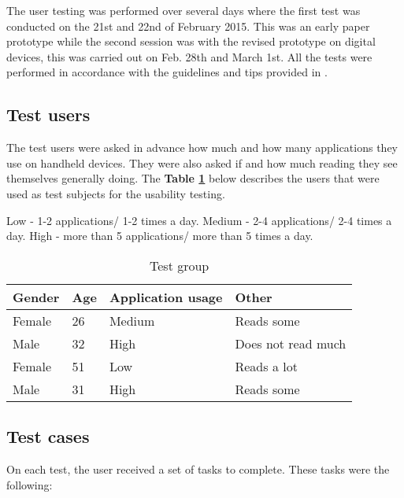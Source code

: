 The user testing was performed over several days where the first test was conducted on the 21st and 22nd of February 2015. This was an early paper prototype while the second session was with the revised prototype on digital devices\cite{protoIO}, this was carried out on Feb. 28th and March 1st. All the tests were performed in accordance with the guidelines and tips provided in \cite{norman2007designing}.

\subsection{Test users}

The test users were asked in advance how much and how many applications they use on handheld devices. They were also asked if and how much reading they see themselves generally doing. The \textbf{Table \ref{Tab:testgroup}} below describes the users that were used as test subjects for the usability testing.  \newline

Low - 1-2 applications/ 1-2 times a day.\newline
Medium - 2-4 applications/ 2-4 times a day.\newline
High - more than 5 applications/ more than 5 times a day.

\begin{table}[H]
	\caption{Test group}
	\label{Tab:testgroup}
	\begin{center}
		\begin{tabular}{ | l | l | l | l |}
			\hline
			\textbf{Gender} & \textbf{Age} & \textbf{Application usage} & \textbf{Other} \\ \hline
			Female & 26 & Medium & Reads some \\\hline
			Male & 32 & High & Does not read much \\\hline
			Female & 51 & Low & Reads a lot \\\hline
			Male & 31 & High & Reads some \\\hline 	
		\end{tabular}
	\end{center}
\end{table}

\subsection{Test cases}

On each test, the user received a set of tasks to complete. These tasks were the following:


